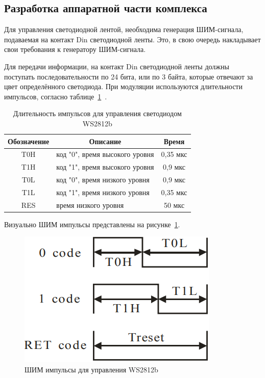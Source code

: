 \subsection{Разработка аппаратной части комплекса}

Для управления светодиодной лентой, необходима генерация ШИМ-сигнала, подаваемая на контакт Din светодиодной ленты. Это, в свою очередь накладывает свои требования к генератору ШИМ-сигнала.

Для передачи информации, на контакт Din светодиодной ленты должны поступать последовательности по 24 бита, или по 3 байта, которые отвечают за цвет определённого светодиода. При модуляции используются длительности импульсов, согласно таблице~\ref{tab:ws2812__data_transfer_time}~\cite{Worldseim}.

\begin{table}[H]
  \caption{Длительность импульсов для управления светодиодом WS2812b}
  \label{tab:ws2812__data_transfer_time}
  \begin{tabular}{|c|l|c|}
  \hline
  \textbf{Обозначение} & \multicolumn{1}{c|}{\textbf{Описание}} & \textbf{Время} \\ \hline
  T0H                  & код "0", время высокого уровня         & 0,35 мкс       \\ \hline
  T1H                  & код "1", время высокого уровня         & 0,9 мкс        \\ \hline
  T0L                  & код "0", время низкого уровня          & 0,9 мкс        \\ \hline
  T1L                  & код "1", время низкого уровня          & 0,35 мкс       \\ \hline
  RES                  & время низкого уровня                   & 50 мкс         \\ \hline
  \end{tabular}
\end{table}

Визуально ШИМ импульсы представлены на рисунке~\ref{img:WS2812__PWM_codes}.

\begin{figure}[H]
  \centering
  \includegraphics[height=0.2\textheight]{assets/images/practical/PWM__codes.png}
  \caption{ШИМ импульсы для управления WS2812b}
  \label{img:WS2812__PWM_codes}
\end{figure}

